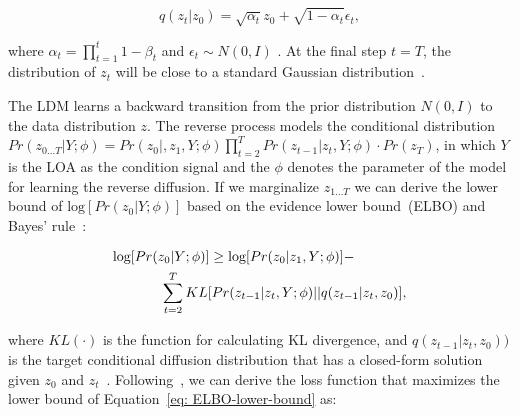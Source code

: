 \documentclass[lettersize,journal]{IEEEtran}
\begin{document}
\begin{equation}
    \label{eq: close-form-q(t)}
    q(z_{t}|z_{0})=\sqrt{\alpha_{t}}z_0+\sqrt{1-\alpha_{t}}\epsilon_t, 
\end{equation}

\noindent
where $\alpha_{t}=\prod_{t=1}^{t}1-\beta_{t}$ and $\epsilon_{t}\sim N(0,I)$ . At the final step $t=T$, the distribution of $z_{t}$ will be close to a standard Gaussian distribution~\cite{DDPM}. 

The LDM learns a backward transition from the prior distribution $N(0,I)$ to the data distribution $z$. The reverse process models the conditional distribution $Pr(z_{0...T}| Y; \phi)=Pr(z_0|, z_1, Y; \phi)\prod_{t=2}^{T}Pr(z_{t-1}|z_{t}, Y; \phi) \cdot Pr(z_T)$, in which $Y$ is the LOA as the condition signal and the $\phi$ denotes the parameter of the model for learning the reverse diffusion. If we marginalize $z_{1...T}$ we can derive the lower bound of $\text{log}[Pr(z_0| Y; \phi)]$ based on the evidence lower bound~(ELBO) and Bayes' rule~\cite{DDPM}:

\begin{align}
    \label{eq: ELBO-lower-bound}
    \text{log}[Pr(z_0| Y; \phi)] &\geq \text{log}[Pr(z_0|z_1, Y; \phi)] \nonumber - \\
    &\quad \hspace{-4.5em} \sum_{t=2}^{T}KL[Pr(z_{t-1}|z_{t}, Y; \phi) || q(z_{t-1}|z_t, z_0)],
\end{align}

\noindent
where $KL(\cdot)$ is the function for calculating KL divergence, and $q(z_{t-1}|z_t, z_0))$ is the target conditional diffusion distribution that has a closed-form solution given $z_0$ and $z_t$~\cite{DDPM}.  Following~\cite{DDPM}, we can derive the loss function that maximizes the lower bound of Equation~\eqref{eq: ELBO-lower-bound} as:
\end{document}
